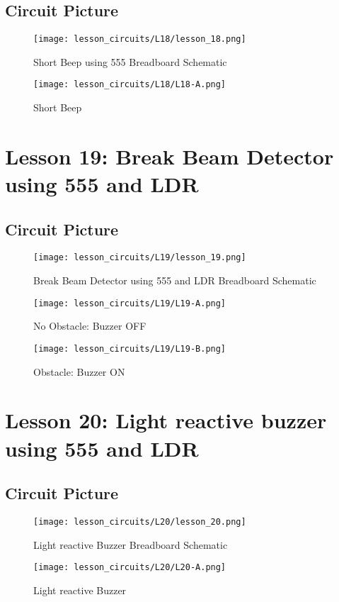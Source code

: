 \subsection{Circuit Picture}
\begin{figure}[htp]
    \centering
    \texttt{[image: lesson\_circuits/L18/lesson\_18.png]}
    \caption{Short Beep using 555 Breadboard Schematic}
    \label{fig:555_sbeep_sch}
\end{figure}
\begin{figure}[htp]
    \centering
    \texttt{[image: lesson\_circuits/L18/L18-A.png]}
    \caption{Short Beep}
    \label{fig:555_sbeep_obb}
\end{figure}
\section{Lesson 19: Break Beam Detector using 555 and LDR}
\subsection{Circuit Picture}
\begin{figure}[htp]
    \centering
    \texttt{[image: lesson\_circuits/L19/lesson\_19.png]}
    \caption{Break Beam Detector using 555 and LDR Breadboard Schematic}
    \label{fig:555_bbdet_sch}
\end{figure}
\begin{figure}[htp]
    \centering
    \texttt{[image: lesson\_circuits/L19/L19-A.png]}
    \caption{No Obstacle: Buzzer OFF}
    \label{fig:555_bbdet_obb}
\end{figure}
\begin{figure}[htp]
    \centering
    \texttt{[image: lesson\_circuits/L19/L19-B.png]}
    \caption{Obstacle: Buzzer ON}
    \label{fig:555_bbdet_obb1}
\end{figure}
\section{Lesson 20: Light reactive buzzer using 555 and LDR}
\subsection{Circuit Picture}
\begin{figure}[htp]
    \centering
    \texttt{[image: lesson\_circuits/L20/lesson\_20.png]}
    \caption{Light reactive Buzzer Breadboard Schematic}
    \label{fig:555_ldrbuzz_sch}
\end{figure}
\begin{figure}[htp]
    \centering
    \texttt{[image: lesson\_circuits/L20/L20-A.png]}
    \caption{Light reactive Buzzer}
    \label{fig:555_ldrbuzz_obb}
\end{figure}
